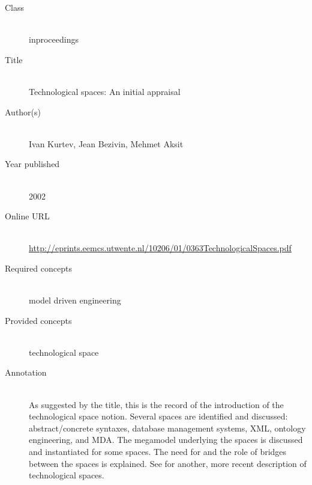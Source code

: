 \begin{description}
\item[Class]\mbox{}\\
inproceedings
\item[Title]\mbox{}\\
Technological spaces: An initial appraisal
\item[Author(s)]\mbox{}\\
Ivan Kurtev, Jean Bezivin, Mehmet Aksit\item[Year published]\mbox{}\\
2002
\item[Online URL]\mbox{}\\
{\footnotesize\url{http://eprints.eemcs.utwente.nl/10206/01/0363TechnologicalSpaces.pdf}}
\item[Required concepts]\mbox{}\\
model driven engineering\item[Provided concepts]\mbox{}\\
technological space\item[Annotation]\mbox{}\\
As suggested by the title, this is the record of the introduction of the technological space notion. Several spaces are identified and discussed: abstract/concrete syntaxes, database management systems, XML, ontology engineering, and MDA. The megamodel underlying the spaces is discussed and instantiated for some spaces. The need for and the role of bridges between the spaces is explained. See  for another, more recent description of technological spaces.
\end{description}

